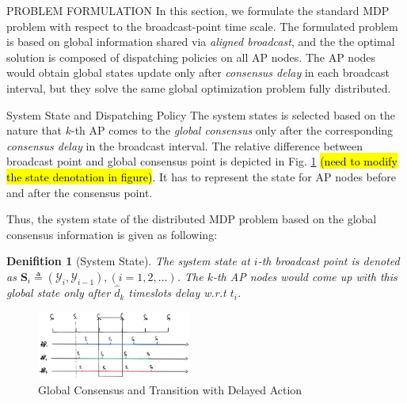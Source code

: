 \documentclass[10pt, conference, letterpaper]{IEEEtran}
\newtheorem{definition}{Denifition}
\newcommand{\define}{\triangleq}
\newcommand{\Stat}{\mathbf{S}}
\newcommand{\Obsv}{\mathcal{Y}}
\begin{document}
    \begin{section}{PROBLEM FORMULATION}
        \label{sec:formulation}
        In this section, we formulate the standard MDP problem with respect to the broadcast-point time scale. The formulated problem is based on global information shared via \emph{aligned broadcast}, and the the optimal solution is composed of dispatching policies on all AP nodes. The AP nodes would obtain global states update only after \emph{consensus delay} in each broadcast interval, but they solve the same global optimization problem fully distributed.

        \begin{subsection}{System State and Dispatching Policy}
            The system states is selected based on the nature that $k$-th AP comes to the \emph{global consensus} only after the corresponding \emph{consensus delay} in the broadcast interval.
            The relative difference between broadcast point and global consensus point is depicted in Fig. \ref{fig:br-trans} \hl{(need to modify the state denotation in figure)}. It has to represent the state for AP nodes before and after the consensus point.

            Thus, the system state of the distributed MDP problem based on the global consensus information is given as following:
            \begin{definition}[System State]
                The system state at $i$-th broadcast point is denoted as $\Stat_i \define (\Obsv_{i}, \Obsv_{i-1}), (i=1,2,\dots)$.
                The $k$-th AP nodes would come up with this global state only after $\hat{d}_k$ timeslots delay w.r.t $t_i$.
            \end{definition}
            \begin{figure}[ht]
                \centering
                \includegraphics[width=0.45\textwidth]{broadcast-trans.png}
                \caption{Global Consensus and Transition with Delayed Action}
                \label{fig:br-trans}
            \end{figure}


\end{subsection}
\end{section}
\end{document}
